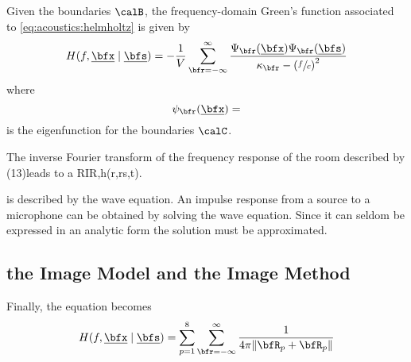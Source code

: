 
Given the boundaries $\calB$, the frequency-domain Green's function associated to \cref{eq:acoustics:helmholtz} is given by
\begin{equation}
    \label{eq:acoustics:greenBounded}
    H(f, \positionMicrophone \mid \positionSource) =
        - \frac{1}{V}
        \sum_{\pos=-\infty}^{\infty}
        \frac{\Psi_{\pos}(\positionMicrophone)\Psi_{\pos}(\positionSource)}{\kappa_{\pos} - \kparen{\sfrac{f}{c}}^2}
\end{equation}
where
\begin{equation}
    \psi_{\pos}(\positionMicrophone) =
\end{equation}
is the eigenfunction for the boundaries $\calC$.

The inverse Fourier transform of the frequency response of the room described by (13)leads to a RIR,h(r,rs,t).

 is described by the wave equation.
An impulse response from a source to a microphone can be obtained by solving the wave equation.
Since it can seldom be expressed in an analytic form the solution must be approximated.


\subsection{the Image Model and the Image Method}
Finally, the equation becomes
\begin{equation}
    \label{eq:acoustics:ims:frourier}
    H(f, \positionMicrophone \mid \positionSource) =
        \sum_{p=1}^{8}
            \sum_{\pos=-\infty}^{\infty}
                \frac{1}{4 \pi \norm{\coordinatePermutation_p +  \coordinatePermutation_p}}
\end{equation}


